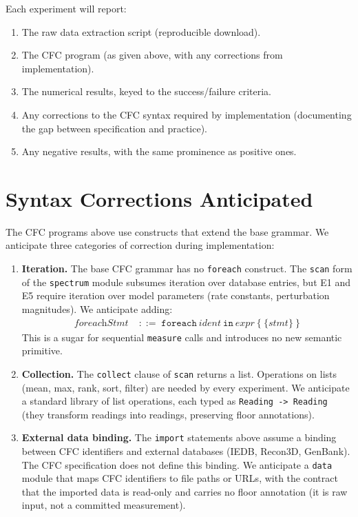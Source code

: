 \documentclass[11pt,a4paper]{article}
\theoremstyle{expthm}
\theoremstyle{definition}
\theoremstyle{remark}
\newcommand{\cf}[1]{\texttt{#1}}
\begin{document}
Each experiment will report:
\begin{enumerate}[leftmargin=1.4em,itemsep=2pt]
\item The raw data extraction script (reproducible download).
\item The CFC program (as given above, with any corrections from
  implementation).
\item The numerical results, keyed to the success/failure criteria.
\item Any corrections to the CFC syntax required by implementation
  (documenting the gap between specification and practice).
\item Any negative results, with the same prominence as positive ones.
\end{enumerate}

\section{Syntax Corrections Anticipated}
\label{sec:corrections}

The CFC programs above use constructs that extend the base grammar. We
anticipate three categories of correction during implementation:

\begin{enumerate}[leftmargin=1.4em,itemsep=3pt]
\item \textbf{Iteration.} The base CFC grammar has no \cf{foreach}
  construct. The \cf{scan} form of the \cf{spectrum} module subsumes
  iteration over database entries, but E1 and E5 require iteration over
  model parameters (rate constants, perturbation magnitudes). We
  anticipate adding:
  \begin{align*}
  \textit{foreachStmt} &\;::=\; \cf{foreach}\ \textit{ident}\
    \cf{in}\ \textit{expr}\ \cf{\{}\ \{\textit{stmt}\}\ \cf{\}}
  \end{align*}
  This is a sugar for sequential \cf{measure} calls and introduces no new
  semantic primitive.

\item \textbf{Collection.} The \cf{collect} clause of \cf{scan} returns a
  list. Operations on lists (mean, max, rank, sort, filter) are needed
  by every experiment. We anticipate a standard library of list
  operations, each typed as \cf{Reading -> Reading} (they transform
  readings into readings, preserving floor annotations).

\item \textbf{External data binding.} The \cf{import} statements above
  assume a binding between CFC identifiers and external databases (IEDB,
  Recon3D, GenBank). The CFC specification does not define this binding.
  We anticipate a \cf{data} module that maps CFC identifiers to file
  paths or URLs, with the contract that the imported data is read-only
  and carries no floor annotation (it is raw input, not a committed
  measurement).
\end{enumerate}
\end{document}
